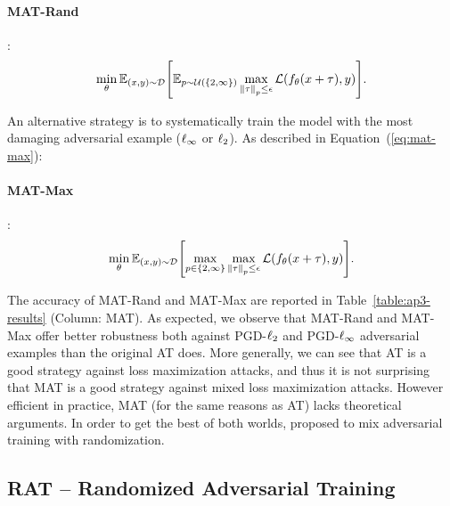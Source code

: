 \paragraph{MAT-Rand}:
\begin{equation}
  \min_{\theta} \Ebb_{(x, y) \sim \mathcal{D}} \left[\Ebb_{p\sim\mathcal{U}({\{2, \infty\})}} \max_{\norm{\tau}_p \leq \epsilon} \mathcal{L} \left( f_{\theta}(x+\tau), y \right) \right].
  \label{eq:mat-rand}
\end{equation}

An alternative strategy is to systematically train the model with the most damaging adversarial example ($\ell_\infty $ or $\ell_2 $). As described in Equation~(\ref{eq:mat-max}): 

\paragraph{MAT-Max}:
\begin{equation}
    \min_{\theta} \Ebb_{(x, y) \sim \mathcal{D}} \left[ \max_{p \in \{2, \infty\}} \max_{\norm{\tau}_p \leq \epsilon} \mathcal{L} \left( f_{\theta}(x+\tau), y \right) \right].
    \label{eq:mat-max}
\end{equation}

The accuracy of MAT-Rand and MAT-Max are reported in Table~\ref{table:ap3-results} (Column: MAT).
As expected, we observe that MAT-Rand and MAT-Max offer better robustness both against PGD-$\ell_2 $ and PGD-$\ell_\infty $ adversarial examples than the original AT does.
More  generally, we can see that AT is a good strategy against loss maximization attacks, and thus it is not surprising that MAT is a good strategy against mixed loss maximization attacks.
However efficient in practice, MAT (for the same reasons as AT) lacks theoretical arguments.
In order to get the best of both worlds, \cite{salman2019provably} proposed to mix adversarial training with randomization.  


\subsection{RAT -- Randomized Adversarial Training}
\label{subsection:ap3-randomized_adversarial_training}

